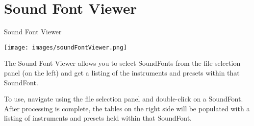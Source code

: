 \section{Sound Font Viewer}\label{soundFontViewer}

Sound Font Viewer

\texttt{[image: images/soundFontViewer.png]}

The Sound Font Viewer allows you to select SoundFonts from the file
selection panel (on the left) and get a listing of the instruments and
presets within that SoundFont.

To use, navigate using the file selection panel and double-click on a
SoundFont. After processing is complete, the tables on the right side
will be populated with a listing of instruments and presets held within
that SoundFont.
